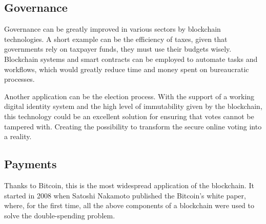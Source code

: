 \subsection{Governance}
\label{sec:governance}

Governance can be greatly improved in various sectors by blockchain technologies.
A short example can be the efficiency of taxes, given that governments rely on 
taxpayer funds, they must use their budgets wisely. Blockchain systems 
and smart contracts can be employed to automate tasks and workflows, which would 
greatly reduce time and money spent on bureaucratic processes.\cite{binancevision}

Another application can be the election process. With the support of a working digital 
identity system and the high level of immutability given by the blockchain, this 
technology could be an excellent solution for ensuring that votes cannot be tampered with.
Creating the possibility to transform the secure online voting into a reality. 

\subsection{Payments}
\label{sec:payments}

Thanks to Bitcoin, this is the most widespread application of the blockchain. It started in 
2008 when Satoshi Nakamoto published the Bitcoin's white paper, where, for the first time, 
all the above components of a blockchain were used to solve the double-spending problem.\pagebreak


